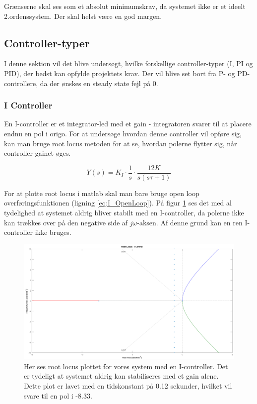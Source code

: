 Grænserne skal ses som et absolut minimumskrav, da systemet ikke er et ideelt 2.ordenssystem. Der skal helst være en god margen.

\subsection{Controller-typer}

I denne sektion vil det blive undersøgt, hvilke forskellige controller-typer (I, PI og PID), der bedst kan opfylde projektets krav. Der vil blive set bort fra P- og PD-controllere, da der ønskes en steady state fejl på 0.

\subsubsection{I Controller}

En I-controller er et integrator-led med et gain - integratoren svarer til at placere endnu en pol i origo. For at undersøge hvordan denne controller vil opføre sig, kan man bruge root locus metoden for at se, hvordan polerne flytter sig, når controller-gainet øges. 

\begin{equation}\label{eq:I_OpenLoop}
Y(s)=K_{I}\cdot\frac{1}{s}\cdot\frac{12K}{s(s\tau+1)}
\end{equation}

For at plotte root locus i matlab skal man bare bruge open loop overføringsfunktionen (ligning \ref{eq:I_OpenLoop}). På figur \ref{fig:I_rlocus} ses det med al tydelighed at systemet aldrig bliver stabilt med en I-controller, da polerne ikke kan trækkes over på den negative side af $j\omega$-aksen. Af denne grund kan en ren I-controller ikke bruges.

\begin{figure}[ht]
	\begin{center}
		\includegraphics[scale=0.35]{Billeder/I_rlocus.PNG}
	\end{center}
\caption{Her ses root locus plottet for vores system med en I-controller. Det er tydeligt at systemet aldrig kan stabiliseres med et gain alene. Dette plot er lavet med en tidskonstant på 0.12 sekunder, hvilket vil svare til en pol i -8.33.}
\label{fig:I_rlocus}
\end{figure}

